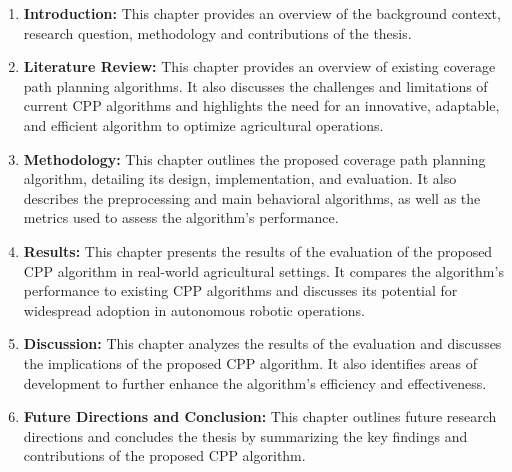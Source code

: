 \begin{enumerate}
  \item \textbf{Introduction:} This chapter provides an overview of the background context, research question, methodology and contributions of the thesis. 
  \item \textbf{Literature Review:} This chapter provides an overview of existing coverage path planning algorithms. It also discusses the challenges and limitations of current CPP algorithms and highlights the need for an innovative, adaptable, and efficient algorithm to optimize agricultural operations.
  \item \textbf{Methodology:} This chapter outlines the proposed coverage path planning algorithm, detailing its design, implementation, and evaluation. It also describes the preprocessing and main behavioral algorithms, as well as the metrics used to assess the algorithm's performance.
  \item \textbf{Results:} This chapter presents the results of the evaluation of the proposed CPP algorithm in real-world agricultural settings. It compares the algorithm's performance to existing CPP algorithms and discusses its potential for widespread adoption in autonomous robotic operations.
  \item \textbf{Discussion:} This chapter analyzes the results of the evaluation and discusses the implications of the proposed CPP algorithm. It also identifies areas of development to further enhance the algorithm's efficiency and effectiveness.
  \item \textbf{Future Directions and Conclusion:} This chapter outlines future research directions and concludes the thesis by summarizing the key findings and contributions of the proposed CPP algorithm.
  

\end{enumerate}